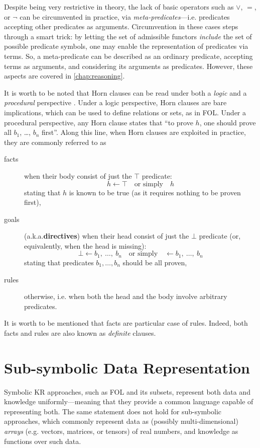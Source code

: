 \documentclass[12pt,a4paper,openright,twoside]{book}
\begin{document}
Despite being very restrictive in theory, the lack of basic operators such as $\vee$, $=$, or $\lnot$ can be circumvented in practice, via \emph{meta-predicates}---i.e. predicates accepting other predicates as arguments.
%
Circumvention in these cases steps through a smart trick: by letting the set of admissible functors \emph{include} the set of possible predicate symbols, one may enable the representation of predicates via terms.
%
So, a meta-predicate can be described as an ordinary predicate, accepting terms as arguments, and considering its arguments as predicates.
%
However, these aspects are covered in \cref{chap:reasoning}.

It is worth to be noted that Horn clauses can be read under both a \emph{logic} and a \emph{procedural} perspective \cite{Kowalski1976}.
%
Under a logic perspective, Horn clauses are bare implications, which can be used to define relations or sets, as in FOL.
%
Under a procedural perspective, any Horn clause states that ``to prove $h$, one should prove all $b_1$, \ldots, $b_n$ first''.
%
Along this line, when Horn clauses are exploited in practice, they are commonly referred to as
%
\begin{description}
    \item[facts] when their body consist of just the $\top$ predicate:
    $$ h \leftarrow \top \quad \text{or simply} \quad h$$
    stating that $h$ is known to be true (as it requires nothing to be proven first),

    \item[goals] (a.k.a.\textbf{directives}) when their head consist of just the $\bot$ predicate (or, equivalently, when the head is missing):
    $$
    \bot \leftarrow b_1,\ \ldots,\ b_n
    \quad
    \text{or simply}
    \quad
    \leftarrow b_1,\ \ldots,\ b_n
    $$
    stating that predicates $b_1, \ldots, b_n$ should be all proven,

    \item[rules] otherwise, i.e. when both the head and the body involve arbitrary predicates.
\end{description}
%
It is worth to be mentioned that facts are particular case of rules.
%
Indeed, both facts and rules are also known as \emph{definite} clauses.

\section{Sub-symbolic Data Representation}

Symbolic KR approaches, such as FOL and its subsets, represent both data and knowledge uniformly---meaning that they provide a common language capable of representing both.
%
The same statement does not hold for sub-symbolic approaches, which commonly represent data as (possibly multi-dimensional) \emph{arrays} (e.g. vectors, matrices, or tensors) of real numbers, and knowledge as functions over such data.
\end{document}
